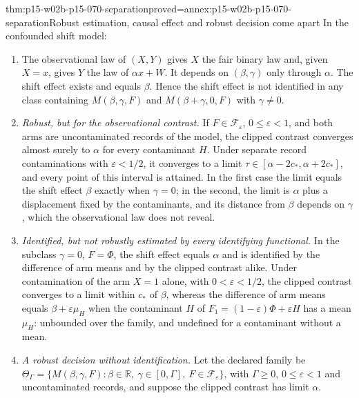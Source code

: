 \begin{hbtheorem}{thm:p15-w02b-p15-070-separation}{proved=annex:p15-w02b-p15-070-separation}{Robust estimation, causal effect and robust decision come apart}
In the confounded shift model:
\begin{enumerate}
\item The observational law of \((X,Y)\) gives \(X\) the fair
      binary law and, given \(X=x\), gives \(Y\) the law of
      \(\alpha x+W\). It depends on \((\beta,\gamma)\) only through
      \(\alpha\). The shift effect exists and equals \(\beta\). Hence
      the shift effect is not identified in any class containing
      \(M(\beta,\gamma,F)\) and \(M(\beta+\gamma,0,F)\) with
      \(\gamma\ne0\).
\item \emph{Robust, but for the observational contrast.} If
      \(F\in\mathcal F_\varepsilon\), \(0\leq\varepsilon<1\), and both
      arms are uncontaminated records of the model, the clipped contrast
      converges almost surely to \(\alpha\) for every contaminant \(H\).
      Under separate record contaminations with \(\varepsilon<1/2\), it
      converges to a limit \(\tau\in[\alpha-2c_*,\alpha+2c_*]\), and
      every point of this interval is attained. In the first case the
      limit equals the shift effect \(\beta\) exactly when \(\gamma=0\);
      in the second, the limit is \(\alpha\) plus a displacement fixed by
      the contaminants, and its distance from \(\beta\) depends on
      \(\gamma\), which the observational law does not reveal.
\item \emph{Identified, but not robustly estimated by every identifying
      functional.} In the subclass \(\gamma=0\), \(F=\Phi\), the shift
      effect equals \(\alpha\) and is identified by the difference of
      arm means and by the clipped contrast alike. Under contamination of
      the arm \(X=1\) alone, with \(0<\varepsilon<1/2\), the clipped
      contrast converges to a limit within \(c_*\) of \(\beta\), whereas
      the difference of arm means equals \(\beta+\varepsilon\mu_H\) when
      the contaminant \(H\) of \(F_1=(1-\varepsilon)\Phi+\varepsilon H\)
      has a mean \(\mu_H\): unbounded over the family, and undefined for
      a contaminant without a mean.
\item \emph{A robust decision without identification.} Let the declared
      family be
      \(\Theta_\Gamma=\{M(\beta,\gamma,F):\beta\in\mathbb R,\
      \gamma\in[0,\Gamma],\ F\in\mathcal F_\varepsilon\}\), with
      \(\Gamma\geq0\), \(0\leq\varepsilon<1\) and uncontaminated
      records, and suppose the clipped contrast has limit \(\alpha\).

\end{enumerate}
\end{hbtheorem}
